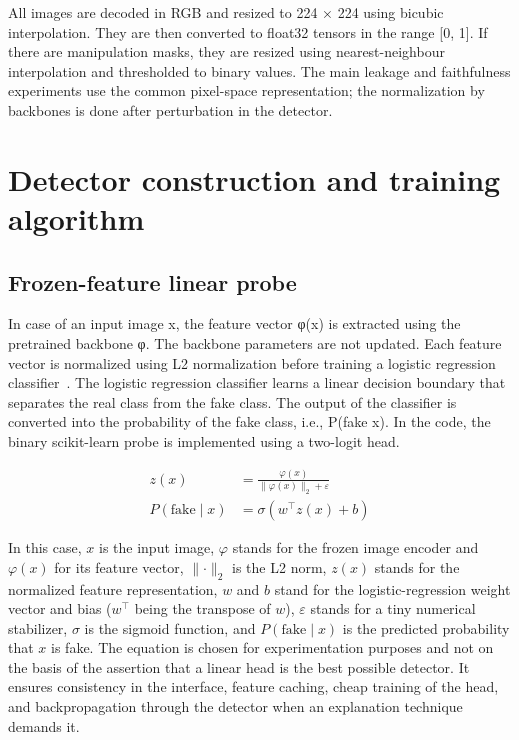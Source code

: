 All images are decoded in RGB and resized to 224 × 224 using bicubic
interpolation. They are then converted to float32 tensors in the range
{[}0, 1{]}. If there are manipulation masks, they are resized using
nearest-neighbour interpolation and thresholded to binary values. The
main leakage and faithfulness experiments use the common pixel-space
representation; the normalization by backbones is done after
perturbation in the detector.

\section{\texorpdfstring{\textbf{Detector construction and training
algorithm}}{Detector construction and training algorithm}}\label{detector-construction-and-training-algorithm}

\subsection{\texorpdfstring{\textbf{Frozen-feature linear
probe}}{Frozen-feature linear probe}}\label{frozen-feature-linear-probe}

In case of an input image x, the feature vector φ(x) is extracted using
the pretrained backbone φ. The backbone parameters are not updated. Each
feature vector is normalized using L2 normalization before training a
logistic regression classifier~\cite{alain2017probes}. The logistic regression classifier
learns a linear decision boundary that separates the real class from the
fake class. The output of the classifier is converted into the
probability of the fake class, i.e., P(fake \textbar{} x). In the code,
the binary scikit-learn probe is implemented using a two-logit head.

\begin{align}
    z(x) &= \frac{\varphi(x)}{\lVert \varphi(x) \rVert_2 + \varepsilon} \label{eq:probe-feature} \\
    P(\text{fake} \mid x) &= \sigma\!\left(w^{\top} z(x) + b\right) \label{eq:probe-probability}
\end{align}

In this case, $x$ is the input image, $\varphi$ stands for the frozen
image encoder and $\varphi(x)$ for its feature vector, $\lVert \cdot
\rVert_2$ is the L2 norm, $z(x)$ stands for the normalized feature
representation, $w$ and $b$ stand for the logistic-regression weight
vector and bias ($w^{\top}$ being the transpose of $w$), $\varepsilon$
stands for a tiny numerical stabilizer, $\sigma$ is the sigmoid
function, and $P(\text{fake} \mid x)$ is the predicted probability that
$x$ is fake. The equation is chosen for
experimentation purposes and not on the basis of the assertion that a
linear head is the best possible detector. It ensures consistency in the
interface, feature caching, cheap training of the head, and
backpropagation through the detector when an explanation technique
demands it.

